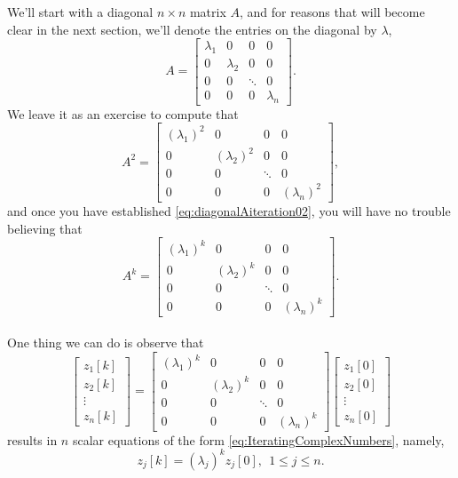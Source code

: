 We'll start with a diagonal $n \times n $ matrix $A$, and for reasons that will become clear in the next section, we'll denote the entries on the diagonal by $\lambda$,
\begin{equation}
    \label{eq:diagonalAiteration}
    A= \left[\begin{array}{cccc} \lambda_1 & 0 & 0 & 0\\
0 & \lambda_2 & 0 & 0\\
0& 0& \ddots & 0\\
0& 0& 0 & \lambda_n\end{array}\right].
\end{equation}
We leave it as an exercise to compute that 
\begin{equation}
    \label{eq:diagonalAiteration02}
    A^2= \left[\begin{array}{cccc} \left(\lambda_1\right)^2 & 0 & 0 & 0\\
0 & \left(\lambda_2\right)^2 & 0 & 0\\
0& 0& \ddots & 0\\
0& 0& 0 & \left(\lambda_n\right)^2\end{array}\right],
\end{equation}
and once you have established \eqref{eq:diagonalAiteration02}, you will have no trouble believing that 
\begin{equation}
    \label{eq:diagonalAiteration03}
    A^k= \left[\begin{array}{cccc} \left(\lambda_1\right)^k & 0 & 0 & 0\\
0 & \left(\lambda_2\right)^k & 0 & 0\\
0& 0& \ddots & 0\\
0& 0& 0 & \left(\lambda_n\right)^k\end{array}\right].
\end{equation}\\

One thing we can do is observe that
\begin{equation}
    \label{eq:diagonalAiteration04}
    \begin{bmatrix} z_1[k] \\z_2[k] \\ \vdots \\ z_n[k]\end{bmatrix} =
  \left[\begin{array}{cccc} \left(\lambda_1\right)^k & 0 & 0 & 0\\
0 & \left(\lambda_2\right)^k & 0 & 0\\
0& 0& \ddots & 0\\
0& 0& 0 & \left(\lambda_n\right)^k\end{array}\right] \begin{bmatrix} z_1[0] \\z_2[0] \\ \vdots \\ z_n[0]\end{bmatrix}
\end{equation}
results in $n$ scalar equations of the form \eqref{eq:IteratingComplexNumbers}, namely,
\begin{equation}
    \label{eq:diagonalAiteration05}
    \boxed{
z_j[k]= (\lambda_j)^k z_j[0],~~1\le j \le n.}
\end{equation}

